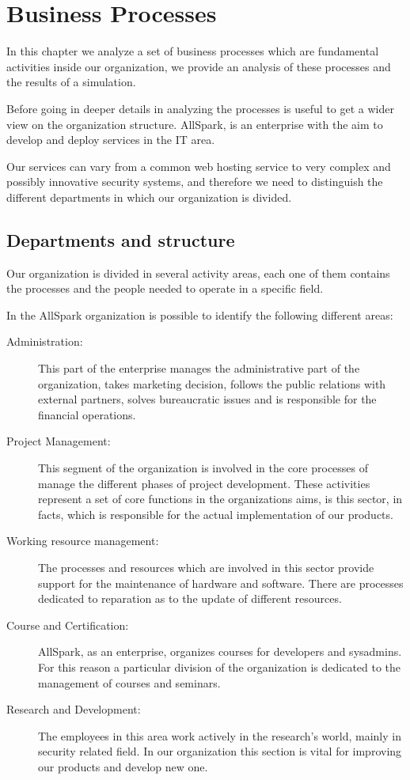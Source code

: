 \chapter{Business Processes}
In this chapter we analyze a set of business processes which are
fundamental activities inside our organization, we provide an analysis of
these processes and the results of a simulation.

Before going in deeper details in analyzing the processes is useful to get
a wider view on the organization structure.
AllSpark, is an enterprise with the aim to develop and deploy services in
the IT area.

Our services can vary from a common web hosting service to very complex and
possibly innovative security systems, and therefore we need to distinguish
the different departments in which our organization is divided.

\section{Departments and structure}
Our organization is divided in several activity areas, each one of them
contains the processes and the people needed to operate in a specific
field.

In the AllSpark organization is possible to identify the following
different areas:
\begin{description}
\item[Administration:] This part of the enterprise manages the
administrative part of the organization, takes marketing decision, follows
the public relations with external partners, solves bureaucratic issues
and is responsible for the financial operations.
\item[Project Management:] This segment of the organization is involved in
the core processes of manage the different phases of project development.
These activities represent a set of core functions in the organizations
aims, is this sector, in facts, which is responsible for the actual
implementation of our products.
\item[Working resource management:] The processes and resources which are
involved in this sector provide support for the maintenance of hardware
and software. There are processes dedicated to reparation as to the update
of different resources.
\item[Course and Certification:] AllSpark, as an enterprise, organizes
courses for developers and sysadmins. For this reason a particular division
of the organization is dedicated to the management of courses and seminars.
\item[Research and Development:] The employees in this area work actively in
the research's world, mainly in security related field. In our organization
this section is vital for improving our products and develop new one.
\end{description}

